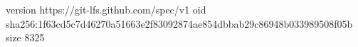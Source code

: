 version https://git-lfs.github.com/spec/v1
oid sha256:1f63cd5c7d46270a51663e2f83092874ae854dbbab29c86948b033989508f05b
size 8325
